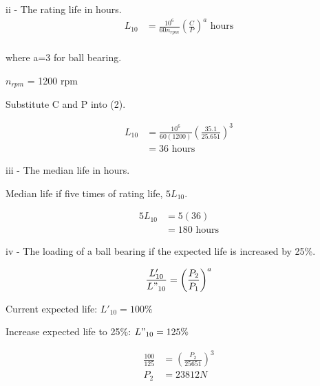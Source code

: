 \documentclass[a4paper, fleqn]{article}
\begin{document}
\vspace{10pt}
ii - The rating life in hours.
\begin{equation}
    \begin{aligned}
        L_{10} &=\frac{10^6}{60n_{rpm}} \left(\frac{C}{P}\right)^a \text{ hours}\\
    \end{aligned}
\end{equation}

where a=3 for ball bearing.

$n_{rpm}$ = 1200 rpm

Substitute C and P into (2).

\begin{equation*}
    \begin{aligned}
        L_{10} &=\frac{10^6}{60(1200)} \left(\frac{35.1}{25.651}\right)^3\\
        &= 36 \text{ hours}
    \end{aligned}
\end{equation*}

\vspace{10pt}
iii - The median life in hours.

Median life if five times of rating life, \(5L_{10}\).

\begin{equation*}
    \begin{aligned}
        5L_{10}&= 5(36) \\
        &= 180 \text{ hours}
    \end{aligned}
\end{equation*}

iv - The loading of a ball bearing if the expected life is increased by 25\%.

\begin{equation}
    \begin{aligned}
        \frac{L'_{10}}{L"_{10}} = \left(\frac{P_2}{P_1}\right)^a
    \end{aligned}
\end{equation}

Current expected life: \( L'_{10}=100\%\)

Increase expected life to 25\%: \( L"_{10}=125\%\)

\begin{equation*}
    \begin{aligned}
        \frac{100}{125} &= \left(\frac{P_2}{25651}\right)^3 \\
        P_2&= 23812 N \\
    \end{aligned}
\end{equation*}
\end{document}
